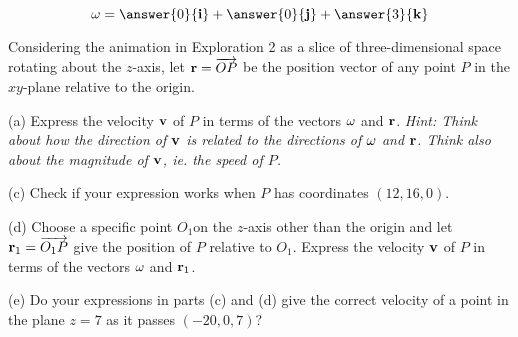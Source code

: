 \documentclass{ximera}
\begin{document}
\begin{question}  \label{Qhfnbyt:Cross}
\[
{\bf \omega} = \answer{0}{\bf i} + \answer{0}{\bf j} + \answer{3}{\bf k}
\]
\end{question}

\begin{question}  \label{Qnjy55:Cross}
Considering the animation in Exploration 2 as a slice of three-dimensional space rotating about the $z$-axis, let ${\bf r} = \overrightarrow{OP}$ be the position vector of any point $P$ in the $xy$-plane relative to the origin.

(a) Express the velocity ${\bf v}$ of $P$ in terms of the vectors ${\bf\omega}$ and ${\bf r}$. \it{Hint:} Think about how the direction of ${\bf v}$ is related to the directions of ${\bf \omega}$ and ${\bf r}$. Think also about the magnitude of ${\bf v}$, ie. the speed of $P$.

(c) Check if your expression works when $P$ has coordinates $(12, 16,0)$.

(d) Choose a specific point $O_1$on the $z$-axis other than the origin and let ${\bf r}_1 = \overrightarrow{O_1P}$ give the position of $P$ relative to $O_1$. Express the velocity ${\bf v}$ of $P$ in terms of the vectors ${\bf\omega}$ and ${\bf r}_1$. 


(e) Do your expressions in parts (c) and (d) give the correct velocity of a point in the plane $z=7$ as it passes $(-20,0,7)$?


\end{question}
\end{document}
